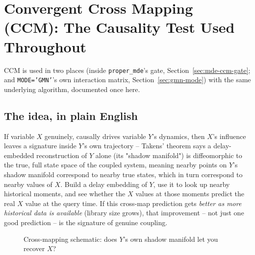 \documentclass[11pt]{article}
\begin{document}
\newpage
\section{Convergent Cross Mapping (CCM): The Causality Test Used Throughout}
\label{sec:ccm}
CCM is used in two places (inside \texttt{proper\_mde}'s gate, Section~\ref{sec:mde-ccm-gate}; and \texttt{MODE='GMN'}'s own interaction matrix, Section~\ref{sec:gmn-mode}) with the same underlying algorithm, documented once here.

\subsection{The idea, in plain English}
If variable $X$ genuinely, causally drives variable $Y$'s dynamics, then $X$'s influence leaves a signature inside $Y$'s own trajectory -- Takens' theorem says a delay-embedded reconstruction of $Y$ alone (its "shadow manifold") is diffeomorphic to the true, full state space of the coupled system, meaning nearby points on $Y$'s shadow manifold correspond to nearby true states, which in turn correspond to nearby values of $X$. Build a delay embedding of $Y$, use it to look up nearby historical moments, and see whether the $X$ values at those moments predict the real $X$ value at the query time. If this cross-map prediction gets \emph{better as more historical data is available} (library size grows), that improvement -- not just one good prediction -- is the signature of genuine coupling.

\begin{figure}[h]
\centering
{}
\caption{Cross-mapping schematic: does $Y$'s own shadow manifold let you recover $X$?}
\label{fig:ccm-schematic}
\end{figure}
\end{document}
